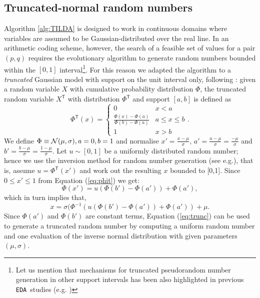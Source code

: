 \documentclass{sig-alternate}
\newcommand{\EDA}{\texttt{EDA}}
\newcommand{\transpose}{\mathsf{T}}
\newcommand{\gauss}[2]{{\cal N}(#1, #2)}
\begin{document}
\subsection{Truncated-normal random numbers}
Algorithm \ref{alg:TILDA} is designed to work in continuous domains where variables are assumed to be Gaussian-distributed over the real line. In an arithmetic coding scheme, however, the search of a feasible set of values for a pair $(p,q)$ requires the evolutionary algorithm to generate random numbers bounded within the $[0,1]$ interval\footnote{Let us mention that mechanisms for truncated pseudorandom number generation in other support intervals has been also highlighted in previous \EDA~studies (e.g. \cite{Mininno08, Grahl04})}. For this reason we adapted the algorithm to a \emph{truncated} Gaussian model with support on the unit interval only, following \cite[page 39]{Devroye86}: given a random variable $X$ with cumulative probability distribution $\Phi$, the truncated random variable $X^\transpose$ with distribution $\Phi^\transpose$ and support $[a,b]$ is defined as
\begin{equation}\label{eq:phit}
\Phi^\transpose(x) = \left \{ \begin{matrix}
  								 0 & x<a \\
  								 \frac{\Phi(x)-\Phi(a)}{\Phi(b)-\Phi(a)} & a \le x \le b \\
  								 1 & x>b 
 \end{matrix} \right.. 
\end{equation}
We define $\Phi \equiv \gauss{\mu}{\sigma}, a=0, b=1$ and normalise $x'=\tfrac{x-\mu}{\sigma}$, $a'=\tfrac{a-\mu}{\sigma}=\tfrac{-\mu}{\sigma}$ and $b'=\tfrac{b-\mu}{\sigma}=\tfrac{1-\mu}{\sigma}$. Let $u \sim [0,1]$ be a uniformly distributed random number; hence we use the inversion method for random number generation (see e.g.\cite{Devroye86}), that is, assume $u = \Phi^\transpose(x')$ and work out the resulting $x$ bounded to [0,1]. Since $0 \le x' \le 1$ from Equation (\ref{eq:phit}) we get:
$$ \Phi(x') = u(\Phi(b')-\Phi(a'))+\Phi(a'),$$
which in turn implies that,
\begin{equation}
x = \sigma(\Phi^{-1}(u(\Phi(b')-\Phi(a'))+\Phi(a'))+\mu.
\label{eq:trunc}
\end{equation}
Since $\Phi(a')$ and $\Phi(b')$ are constant terms, Equation (\ref{eq:trunc}) can be used to generate a truncated random number by computing a uniform random number and one evaluation of the inverse normal distribution with given parameters $(\mu, \sigma)$.  
\end{document}
